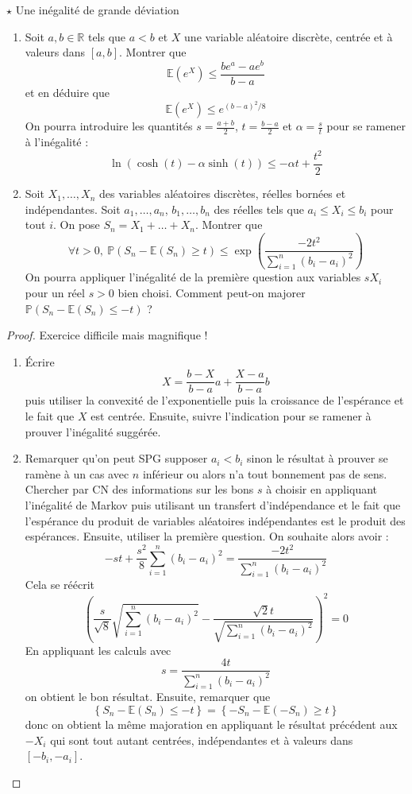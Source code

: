 \documentclass[french,a4paper]{article}
\renewcommand{\P}{\mathbb{P}}
\newcommand{\R}{\mathbb{R}}
\newcommand{\E}{\mathbb{E}}
\theoremstyle{plain}
\theoremstyle{definition}
\theoremstyle{remark}
\begin{document}
\begin{ex}{$\star$ Une inégalité de grande déviation}
	\begin{enumerate}
		\item Soit $a,b\in\R$ tels que $a<b$ et $X$ une variable aléatoire discrète, centrée et à valeurs dans $[a,b]$. Montrer que $$\E(e^X)\leqslant\frac{be^a-ae^b}{b-a}$$ et en déduire que $$\E(e^X)\leqslant e^{(b-a)^2/8}$$ On pourra introduire les quantités $s=\displaystyle\frac{a+b}{2}$, $t=\displaystyle\frac{b-a}{2}$ et $\alpha=\displaystyle\frac{s}{t}$ pour se ramener à l'inégalité : $$\ln\left(\cosh(t)-\alpha\sinh(t)\right)\leqslant-\alpha t+\frac{t^2}{2}$$
		\item Soit $X_1,\ldots, X_n$ des variables aléatoires discrètes, réelles bornées et indépendantes. Soit $a_1,\ldots,a_n$, $b_1,\ldots,b_n$ des réelles tels que $a_i\leqslant X_i\leqslant b_i$ pour tout $i$. On pose $S_n=X_1+\ldots+X_n$. Montrer que $$\forall t>0,\ \P(S_n-\E(S_n)\geqslant t)\leqslant\exp\left(\frac{-2t^2}{\displaystyle\sum_{i=1}^{n}(b_i-a_i)^2}\right)$$ On pourra appliquer l'inégalité de la première question aux variables $sX_i$ pour un réel $s>0$ bien choisi. Comment peut-on majorer $\P(S_n-\E(S_n)\leqslant -t)$ ?
	\end{enumerate}
\end{ex}
\begin{proof}
	Exercice difficile mais magnifique !
	\begin{enumerate}
		\item Écrire $$X=\frac{b-X}{b-a}a+\frac{X-a}{b-a}b$$ puis utiliser la convexité de l'exponentielle puis la croissance de l'espérance et le fait que $X$ est centrée.  Ensuite, suivre l'indication pour se ramener à prouver l'inégalité suggérée.
		\item Remarquer qu'on peut SPG supposer $a_i<b_i$ sinon le résultat à prouver se ramène à un cas avec $n$ inférieur ou alors n'a tout bonnement pas de sens. Chercher par CN des informations sur les bons $s$ à choisir en appliquant l'inégalité de Markov puis utilisant un transfert d'indépendance et le fait que l'espérance du produit de variables aléatoires indépendantes est le produit des espérances. Ensuite, utiliser la première question. On souhaite alors avoir : $$-st+\frac{s^2}{8}\sum_{i=1}^{n}(b_i-a_i)^2=\frac{-2t^2}{\displaystyle\sum_{i=1}^{n}(b_i-a_i)^2}$$ Cela se réécrit $$\left(\frac{s}{\sqrt{8}}\sqrt{\sum_{i=1}^{n}(b_i-a_i)^2}-\frac{\sqrt{2}t}{\sqrt{\displaystyle\sum_{i=1}^{n}(b_i-a_i)^2}}\right)^2=0$$ En appliquant les calculs avec $$s=\frac{4t}{\displaystyle\sum_{i=1}^{n}(b_i-a_i)^2}$$ on obtient le bon résultat. Ensuite, remarquer que $$\left\{S_n-\E(S_n)\leqslant -t\right\}=\left\{-S_n-\E(-S_n)\geqslant t\right\}$$ donc on obtient la même majoration en appliquant le résultat précédent aux $-X_i$ qui sont tout autant centrées, indépendantes et à valeurs dans $[-b_i,-a_i]$. 
	\end{enumerate}
\end{proof}
\end{document}
